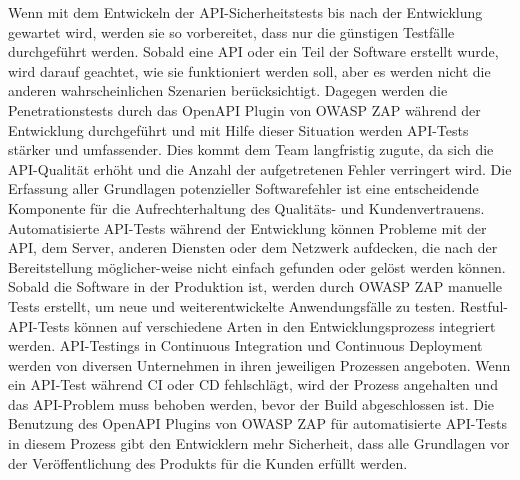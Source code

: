 Wenn mit dem Entwickeln der API-Sicherheitstests bis nach der Entwicklung gewartet wird, werden sie so vorbereitet, dass nur die günstigen Testfälle durchgeführt werden. Sobald eine API oder ein Teil der Software erstellt wurde, wird darauf geachtet, wie sie funktioniert werden soll, aber es werden nicht die anderen wahrscheinlichen Szenarien berücksichtigt. Dagegen werden die Penetrationstests durch das OpenAPI Plugin von OWASP ZAP während der Entwicklung durchgeführt und mit Hilfe dieser Situation werden API-Tests stärker und umfassender. Dies kommt dem Team langfristig zugute, da sich die API-Qualität erhöht und die Anzahl der aufgetretenen Fehler verringert wird. Die Erfassung aller Grundlagen potenzieller Softwarefehler ist eine entscheidende Komponente für die Aufrechterhaltung des Qualitäts- und Kundenvertrauens. Automatisierte API-Tests während der Entwicklung können Probleme mit der API, dem Server, anderen Diensten oder dem Netzwerk aufdecken, die nach der Bereitstellung möglicher-weise nicht einfach gefunden oder gelöst werden können. Sobald die Software in der Produktion ist, werden durch OWASP ZAP manuelle Tests erstellt, um neue und weiterentwickelte Anwendungsfälle zu testen. Restful-API-Tests können auf verschiedene Arten in den Entwicklungsprozess integriert werden. API-Testings in Continuous Integration und Continuous Deployment werden von diversen Unternehmen in ihren jeweiligen Prozessen angeboten. Wenn ein API-Test während CI oder CD fehlschlägt, wird der Prozess angehalten und das API-Problem muss behoben werden, bevor der Build abgeschlossen ist. Die Benutzung des OpenAPI Plugins von OWASP ZAP für automatisierte API-Tests in diesem Prozess gibt den Entwicklern mehr Sicherheit, dass alle Grundlagen vor der Veröffentlichung des Produkts für die Kunden erfüllt werden\cite{restcaseapiimportance16}.
